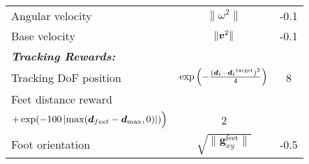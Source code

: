 \begin{table}[ht!]
{\begin{tabular}{l c c}
Angular velocity & $\lVert\omega^2\rVert$ & -0.1 \\
Base velocity & $\lVert \boldsymbol{v}^2\rVert$ & -0.1 \\
\midrule[0.6pt]
\multicolumn{3}{l}{\textit{\textbf{Tracking Rewards:}}} \\
\midrule[0.6pt]
Tracking DoF position & $ \exp \left( - \frac{({\boldsymbol{{d}}_{t}} - {\boldsymbol{{d}}_{t}}^{\text{target}})^2}{4} \right) $ & 8 \\
Feet distance reward & \makecell{
$\frac{1}{2} \Big( \exp(-100 \left| \max(\bs{d}_{\text{feet}} - \bs{d}_{\min}, -0.5) \right|)$ \\ 
$+ \exp(-100 \left| \max(\boldsymbol{d}_{feet} - \boldsymbol{d}_{\max}, 0) \right|) \Big)$
} & 2 \\
Foot orientation & $ \sqrt{\lVert \mathbf{g}_{xy}^{\text{feet}} \rVert} $ & -0.5 \\
\bottomrule[0.95pt]
\end{tabular}
}
\end{table}
